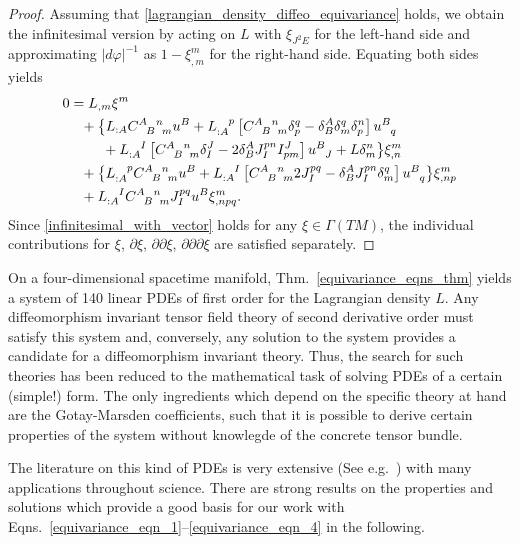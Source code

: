 \begin{proof}
  Assuming that \eqref{lagrangian_density_diffeo_equivariance} holds, we obtain the infinitesimal version by acting on $L$ with $\xi_{J^2E}$ for the left-hand side and approximating $\lvert d\varphi\rvert^{-1}$ as $1 - \xi^m_{,m}$ for the right-hand side. Equating both sides yields
  \begin{equation}\label{infinitesimal_with_vector}
    \begin{aligned}
      0 &{} = L_{,m} \xi^m \\
        &{} \hphantom{=} + \big\{ L_{:A} \gmc{A}{B}{n}{m}u^B + L_{:A}^{\hphantom{:A}p}\left\lbrack\gmc{A}{B}{n}{m} \delta^q_p - \delta^A_B\delta^q_m\delta^n_p\right\rbrack u^{B}_{\hphantom Bq} \\
        &{} \hphantom{=+\{} + L_{:A}^{\hphantom{:A}I} \left\lbrack\gmc{A}{B}{n}{m} \delta^J_I - 2 \delta^A_B J^{pn}_{I} I^J_{pm}\right\rbrack u^B_{\hphantom BJ} + L\delta^n_m \big\} \xi^m_{,n} \\
        &{} \hphantom{=} + \big\{ L_{:A}^{\hphantom{:A}p} \gmc{A}{B}{n}{m} u^B + L_{:A}^{\hphantom{:A}I}\left\lbrack\gmc{A}{B}{n}{m} 2J^{pq}_I - \delta^A_B J^{pn}_I \delta^q_m\right\rbrack u^B_{\hphantom Bq} \big\} \xi^m_{,np} \\
        &{} \hphantom{=} + L_{:A}^{\hphantom{:A}I} \gmc{A}{B}{n}{m} J^{pq}_I u^B \xi^m_{,npq}.
    \end{aligned}
  \end{equation}
Since \eqref{infinitesimal_with_vector} holds for any $\xi\in\Gamma(TM)$, the individual contributions for $\xi$, $\partial\xi$, $\partial\partial\xi$, $\partial\partial\partial\xi$ are satisfied separately.
\end{proof}

On a four-dimensional spacetime manifold, Thm.\ \ref{equivariance_eqns_thm} yields a system of 140 linear PDEs of first order for the Lagrangian density $L$. Any diffeomorphism invariant tensor field theory of second derivative order must satisfy this system and, conversely, any solution to the system provides a candidate for a diffeomorphism invariant theory. Thus, the search for such theories has been reduced to the mathematical task of solving PDEs of a certain (simple!) form. The only ingredients which depend on the specific theory at hand are the Gotay-Marsden coefficients, such that it is possible to derive certain properties of the system without knowlegde of the concrete tensor bundle.

The literature on this kind of PDEs is very extensive (See e.g.\ \cite{Seiler_2010}) with many applications throughout science. There are strong results on the properties and solutions which provide a good basis for our work with Eqns.\ \ref{equivariance_eqn_1}--\ref{equivariance_eqn_4} in the following.

